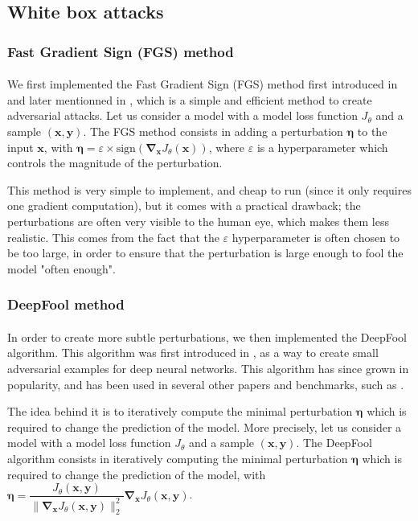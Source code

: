 \documentclass[11pt,twocolumn,letterpaper]{article}
\begin{document}
\subsection{White box attacks}

\subsubsection{Fast Gradient Sign (FGS) method}

\paragraph{} We first implemented the Fast Gradient Sign (FGS) method first introduced in \cite{fast_gradient_sign} and later mentionned in \cite{robustness}, which is a simple and efficient method to create adversarial attacks. Let us consider a model with a model loss function $J_{\theta}$ and a sample $(\bm{x}, \bm{y})$. The FGS method consists in adding a perturbation $\bm{\eta}$ to the input $\bm{x}$, with $\bm{\eta} = \varepsilon \times \text{sign}(\bm{\nabla}_{\bm{x}} J_{\theta}(\bm{x}))$, where $\varepsilon$ is a hyperparameter which controls the magnitude of the perturbation. 

This method is very simple to implement, and cheap to run (since it only requires one gradient computation), but it comes with a practical drawback; the perturbations are often very visible to the human eye, which makes them less realistic. This comes from the fact that the $\varepsilon$ hyperparameter is often chosen to be too large, in order to ensure that the perturbation is large enough to fool the model "often enough". 

\subsubsection{DeepFool method}

\paragraph{} In order to create more subtle perturbations, we then implemented the DeepFool algorithm. This algorithm was first introduced in \cite{deepfool}, as a way to create small adversarial examples for deep neural networks. This algorithm has since grown in popularity, and has been used in several other papers and benchmarks, such as \cite{robustness}.

The idea behind it is to iteratively compute the minimal perturbation $\bm{\eta}$ which is required to change the prediction of the model. More precisely, let us consider a model with a model loss function $J_{\theta}$ and a sample $(\bm{x}, \bm{y})$. The DeepFool algorithm consists in iteratively computing the minimal perturbation $\bm{\eta}$ which is required to change the prediction of the model, with $\bm{\eta} = \dfrac{J_{\theta}(\bm{x}, \bm{y})}{\|\bm{\nabla}_{\bm{x}} J_{\theta}(\bm{x}, \bm{y})\|_2^2} \bm{\nabla}_{\bm{x}} J_{\theta}(\bm{x}, \bm{y})$. 
\end{document}
